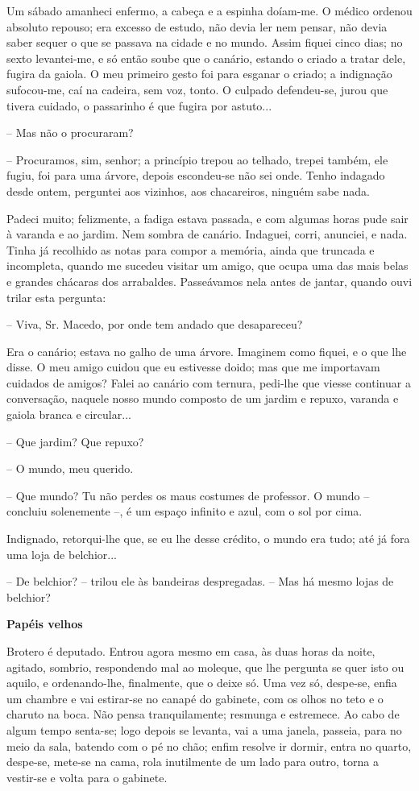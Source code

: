 Um sábado amanheci enfermo, a cabeça e a espinha doíam-me. O médico
ordenou absoluto repouso; era excesso de estudo, não devia ler nem
pensar, não devia saber sequer o que se passava na cidade e no mundo.
Assim fiquei cinco dias; no sexto levantei-me, e só então soube que o
canário, estando o criado a tratar dele, fugira da gaiola. O meu
primeiro gesto foi para esganar o criado; a indignação sufocou-me, caí
na cadeira, sem voz, tonto. O culpado defendeu-se, jurou que tivera
cuidado, o passarinho é que fugira por astuto...

-- Mas não o procuraram?

-- Procuramos, sim, senhor; a princípio trepou ao telhado, trepei
também, ele fugiu, foi para uma árvore, depois escondeu-se não sei onde.
Tenho indagado desde ontem, perguntei aos vizinhos, aos chacareiros,
ninguém sabe nada.

Padeci muito; felizmente, a fadiga estava passada, e com algumas horas
pude sair à varanda e ao jardim. Nem sombra de canário. Indaguei, corri,
anunciei, e nada. Tinha já recolhido as notas para compor a memória,
ainda que truncada e incompleta, quando me sucedeu visitar um amigo, que
ocupa uma das mais belas e grandes chácaras dos arrabaldes. Passeávamos
nela antes de jantar, quando ouvi trilar esta pergunta:

-- Viva, Sr. Macedo, por onde tem andado que desapareceu?

Era o canário; estava no galho de uma árvore. Imaginem como fiquei, e o
que lhe disse. O meu amigo cuidou que eu estivesse doido; mas que me
importavam cuidados de amigos? Falei ao canário com ternura, pedi-lhe
que viesse continuar a conversação, naquele nosso mundo composto de um
jardim e repuxo, varanda e gaiola branca e circular...

-- Que jardim? Que repuxo?

-- O mundo, meu querido.

-- Que mundo? Tu não perdes os maus costumes de professor. O mundo --
concluiu solenemente --, é um espaço infinito e azul, com o sol por
cima.

Indignado, retorqui-lhe que, se eu lhe desse crédito, o mundo era tudo;
até já fora uma loja de belchior...

-- De belchior? -- trilou ele às bandeiras despregadas. -- Mas há mesmo
lojas de belchior?

\textbf{Papéis velhos}

Brotero é deputado. Entrou agora mesmo em casa, às duas horas da noite,
agitado, sombrio, respondendo mal ao moleque, que lhe pergunta se quer
isto ou aquilo, e ordenando-lhe, finalmente, que o deixe só. Uma vez só,
despe-se, enfia um chambre e vai estirar-se no canapé do gabinete, com
os olhos no teto e o charuto na boca. Não pensa tranquilamente; resmunga
e estremece. Ao cabo de algum tempo senta-se; logo depois se levanta,
vai a uma janela, passeia, para no meio da sala, batendo com o pé no
chão; enfim resolve ir dormir, entra no quarto, despe-se, mete-se na
cama, rola inutilmente de um lado para outro, torna a vestir-se e volta
para o gabinete.

